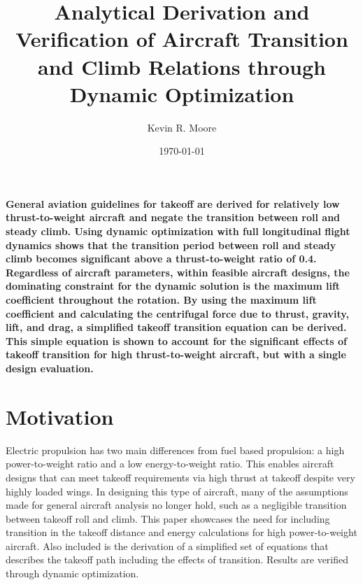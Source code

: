 \documentclass[10pt,english]{article}
\title{\vspace{-20pt}Analytical Derivation and Verification of Aircraft Transition and Climb Relations through Dynamic Optimization }
\author{Kevin R. Moore}
\affil{\vspace{-10pt}Brigham Young University}
\date{\today}
\begin{document}
\maketitle

\textbf{General aviation guidelines for takeoff are derived for relatively low thrust-to-weight aircraft and negate the transition between roll and steady climb.  Using dynamic optimization with full longitudinal flight dynamics shows that the transition period between roll and steady climb becomes significant above a thrust-to-weight ratio of 0.4.   Regardless of aircraft parameters, within feasible aircraft designs, the dominating constraint for the dynamic solution is the maximum lift coefficient throughout the rotation.  By using the maximum lift coefficient and calculating the centrifugal force due to thrust, gravity, lift, and drag, a simplified takeoff transition equation can be derived.  This simple equation is shown to account for the significant effects of takeoff transition for high thrust-to-weight aircraft, but with a single design evaluation.  }



\section{Motivation}

Electric propulsion has two main differences from fuel based propulsion: a high power-to-weight ratio and a low energy-to-weight ratio.  This enables aircraft designs that can meet takeoff requirements via high thrust at takeoff despite very highly loaded wings\cite{leap}.  In designing this type of aircraft, many of the assumptions made for general aircraft analysis no longer hold, such as a negligible transition between takeoff roll and climb.  This paper showcases the need for including transition in the takeoff distance and energy calculations for high power-to-weight aircraft.  Also included is the derivation of a simplified set of equations that describes the takeoff path including the effects of transition.  Results are verified through dynamic optimization.
\begin{center}
\printnomenclature[1.0cm]
\end{center}
\end{document}
